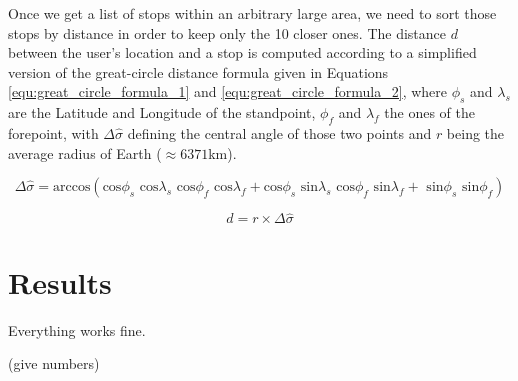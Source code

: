 Once we get a list of stops within an arbitrary large area, we need to sort those stops by distance in order to keep only the 10 closer ones. The distance $d$ between the user's location and a stop is computed according to a simplified version of the great-circle distance formula given in Equations \ref{equ:great_circle_formula_1} and \ref{equ:great_circle_formula_2}, where $\phi_s$ and $\lambda_s$ are the Latitude and Longitude of the standpoint, $\phi_f$ and $\lambda_f$ the ones of the forepoint, with $\Delta \hat{\sigma}$ defining the central angle of those two points and $r$ being the average radius of Earth ($\approx6371$km).

\begin{equation}
\label{equ:great_circle_formula_1}
\Delta \hat{\sigma} = \textrm{arccos}\left(\textrm{cos}\phi_s \textrm{ cos}\lambda_s \textrm{ cos}\phi_f \textrm{ cos}\lambda_f + \textrm{cos}\phi_s \textrm{ sin}\lambda_s \textrm{ cos}\phi_f \textrm{ sin}\lambda_f + \textrm{ sin}\phi_s \textrm{ sin}\phi_f\right)
\end{equation}

\begin{equation}
\label{equ:great_circle_formula_2}
d = r \times \Delta \hat{\sigma}
\end{equation}

\section{Results}

Everything works fine.

(give numbers)